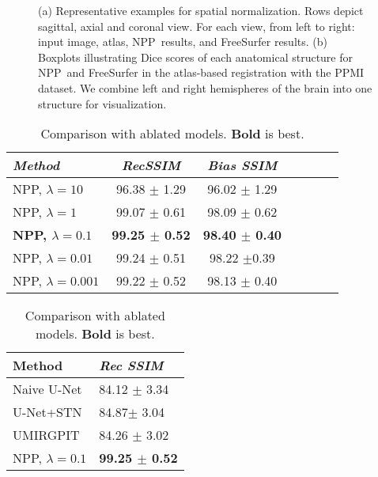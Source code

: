 \documentclass[runningheads]{llncs}
\newcommand{\modelname}{NPP}
\begin{document}
\begin{figure}[t]\centering
    \caption{(a) Representative examples for spatial normalization. Rows depict sagittal, axial and coronal view. For each view, from left to right: input image, atlas, \modelname~results, and FreeSurfer results. (b) Boxplots illustrating Dice scores of each anatomical structure for \modelname~and FreeSurfer in the atlas-based registration with the PPMI dataset. We combine left and right hemispheres of the brain into one structure for visualization.}\label{fig_ab}\end{figure}





\begin{table}[b]
\parbox[t]{.45\linewidth}{\vspace{0pt}
\centering
\caption{Ablation study results of different $\lambda$. \textbf{Bold} is best.}\label{tab_a}

\begin{tabular}{|l|*{6}{c|}}
\hline
\textit{Method} &  \textit{RecSSIM}  & \textit{Bias SSIM}\\\hline
\modelname, $\lambda=10$ & 96.38 $\pm$ 1.29& 96.02 $\pm$ 1.29\\
\modelname, $\lambda=1$ & 99.07 $\pm$ 0.61& 98.09 $\pm$ 0.62\\
\textbf{\modelname, $\lambda=0.1$} & \textbf{99.25 $\pm$ 0.52} & \textbf{98.40 $\pm$ 0.40}\\ 
\modelname, $\lambda=0.01$ & 99.24 $\pm$ 0.51& 98.22 $\pm $0.39\\
\modelname, $\lambda=0.001$ & 99.22 $\pm$ 0.52& 98.13 $\pm$ 0.40\\
\hline
  \end{tabular}
}
\hfill
  \parbox[t]{.45\linewidth}{\vspace{0pt}
\centering
  \caption{Comparison with ablated models. \textbf{Bold} is best.}\label{tab_ad}

\begin{tabular}{|l|l|}
\hline
 Method&\textit{Rec SSIM}\\\hline
Naive U-Net &  84.12 $\pm$ 3.34 \\
U-Net+STN &  84.87$\pm$ 3.04   \\
UMIRGPIT & 84.26  $\pm$ 3.02 
\\\hdashline
\modelname, $\lambda=0.1$ & \textbf{99.25 $\pm$ 0.52}  \\
\hline
\end{tabular}
}
\end{table}
\end{document}
